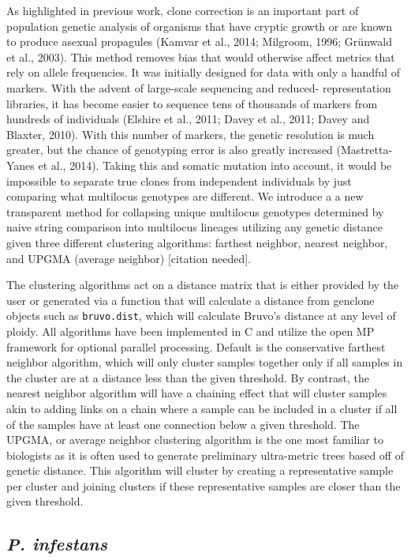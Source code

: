 \documentclass{frontiersSCNS} %
\begin{document}
As highlighted in previous work, clone correction is an important part
of population genetic analysis of organisms that have cryptic growth or
are known to produce asexual propagules (Kamvar et al., 2014; Milgroom,
1996; Grünwald et al., 2003). This method removes bias that would
otherwise affect metrics that rely on allele frequencies. It was
initially designed for data with only a handful of markers. With the
advent of large-scale sequencing and reduced- representation libraries,
it has become easier to sequence tens of thousands of markers from
hundreds of individuals (Elshire et al., 2011; Davey et al., 2011; Davey
and Blaxter, 2010). With this number of markers, the genetic resolution
is much greater, but the chance of genotyping error is also greatly
increased (Mastretta-Yanes et al., 2014). Taking this and somatic
mutation into account, it would be impossible to separate true clones
from independent individuals by just comparing what multilocus genotypes
are different. We introduce a a new transparent method for collapsing
unique multilocus genotypes determined by naive string comparison into
multilocus lineages utilizing any genetic distance given three different
clustering algorithms: farthest neighbor, nearest neighbor, and UPGMA
(average neighbor) {[}citation needed{]}.

The clustering algorithms act on a distance matrix that is either
provided by the user or generated via a function that will calculate a
distance from genclone objects such as \texttt{bruvo.dist}, which will
calculate Bruvo's distance at any level of ploidy. All algorithms have
been implemented in C and utilize the open MP framework for optional
parallel processing. Default is the conservative farthest neighbor
algorithm, which will only cluster samples together only if all samples
in the cluster are at a distance less than the given threshold. By
contrast, the nearest neighbor algorithm will have a chaining effect
that will cluster samples akin to adding links on a chain where a sample
can be included in a cluster if all of the samples have at least one
connection below a given threshold. The UPGMA, or average neighbor
clustering algorithm is the one most familiar to biologists as it is
often used to generate preliminary ultra-metric trees based off of
genetic distance. This algorithm will cluster by creating a
representative sample per cluster and joining clusters if these
representative samples are closer than the given threshold.

\subsection*{\emph{P. infestans}}\label{p.-infestans}
\end{document}

